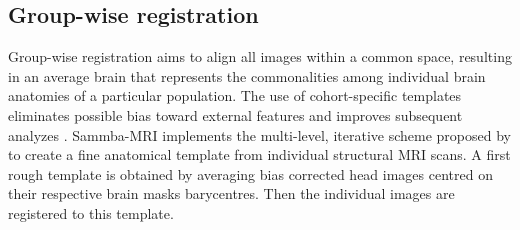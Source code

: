 \documentclass[utf8, a4paper, final, crop]{frontiersSCNS}
\begin{document}
\subsection{Group-wise registration} %

Group-wise registration aims to align all images within a common %
space, resulting in an average brain that represents the commonalities among
individual brain anatomies of a particular population.
%
The use of cohort-specific templates eliminates possible bias toward external
features and improves subsequent analyzes \citep{de2019towards}.
Sammba-MRI implements the multi-level, iterative scheme proposed by \citep{kovavcevic2005three}
to create a fine anatomical 
template from individual structural MRI scans. A first rough template is obtained
by averaging bias corrected head images centred on their respective brain masks barycentres. Then the individual images are registered to this template.
\end{document}
